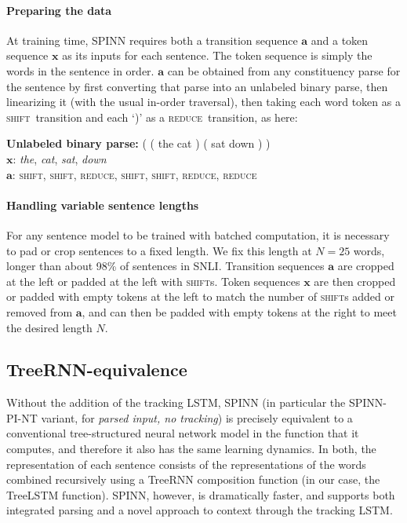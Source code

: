 \documentclass[11pt]{article}
\newcommand{\shift}{\textsc{shift}}
\newcommand{\reduce}{\textsc{reduce}}
\newcommand{\word}[1]{\emph{#1}}
\begin{document}
\paragraph{Preparing the data} At training time, SPINN requires both a transition sequence $\mathbf a$  and a token sequence $\mathbf x$ as its inputs for each sentence. The token sequence is simply the words in the sentence in order. $\mathbf a$ can be obtained from any constituency parse for the sentence by first converting that parse into an unlabeled binary parse, then linearizing it (with the usual in-order traversal), then taking each word token as a \shift\ transition and each `)' as a \reduce\ transition, as here:

\vspace{0.5em}
{\noindent\small
{\bf Unlabeled binary parse:} ( ( the cat ) ( sat down ) )\\
{$\mathbf x$}: \word{the}, \word{cat}, \word{sat}, \word{down}\\
{$\mathbf a$}: \shift, \shift, \reduce, \shift, \shift, \reduce, \reduce
}

\paragraph{Handling variable sentence lengths} For any sentence model to be trained with batched computation, it is necessary to pad or crop sentences to a fixed length. We fix this length at $N = 25$ words, longer than about 98\% of sentences in SNLI\@. Transition sequences $\mathbf a$ are cropped at the left or padded at the left with \shift s. Token sequences $\mathbf x$ are then cropped or padded with empty tokens at the left to match the number of \shift s added or removed from $\mathbf a$, and can then be padded with empty tokens at the right to meet the desired length $N$.


\subsection{TreeRNN-equivalence}

Without the addition of the tracking LSTM, SPINN (in particular the SPINN-PI-NT variant, for \textit{parsed input, no tracking}) is precisely equivalent to a conventional tree-structured neural network model in the function that it computes, and therefore it also has the same learning dynamics. In both, the representation of each sentence consists of the representations of the words combined recursively using a TreeRNN composition function (in our case, the TreeLSTM function). SPINN, however, is dramatically faster, and supports both integrated parsing and a novel approach to context through the tracking LSTM.
\end{document}
